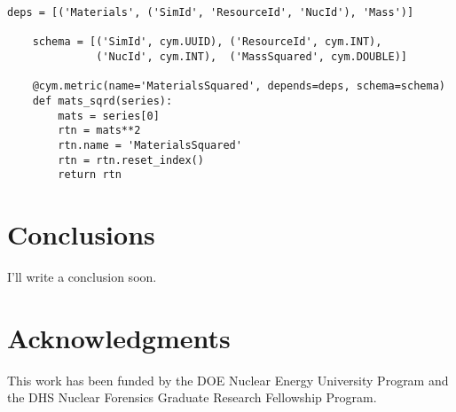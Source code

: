 \documentclass{anstrans}
\begin{document}
\begin{lstlisting}[caption ={Writing a Metric in Cymetric}, label=massmetric]
    deps = [('Materials', ('SimId', 'ResourceId', 'NucId'), 'Mass')]

    schema = [('SimId', cym.UUID), ('ResourceId', cym.INT),
              ('NucId', cym.INT),  ('MassSquared', cym.DOUBLE)]

    @cym.metric(name='MaterialsSquared', depends=deps, schema=schema)
    def mats_sqrd(series):
        mats = series[0]
        rtn = mats**2
        rtn.name = 'MaterialsSquared'
        rtn = rtn.reset_index()
        return rtn
\end{lstlisting}


\section{Conclusions}

I'll write a conclusion soon. 

\section{Acknowledgments}
This work has been funded by the \gls{DOE} Nuclear Energy University Program and the \gls{DHS} Nuclear Forensics Graduate Research Fellowship Program. 



\end{document}
